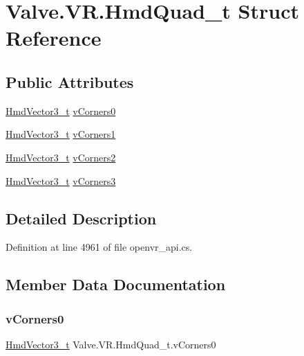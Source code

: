 \hypertarget{struct_valve_1_1_v_r_1_1_hmd_quad__t}{}\section{Valve.\+V\+R.\+Hmd\+Quad\+\_\+t Struct Reference}
\label{struct_valve_1_1_v_r_1_1_hmd_quad__t}
\subsection*{Public Attributes}
\begin{DoxyCompactItemize}
\item 
\mbox{\hyperlink{struct_valve_1_1_v_r_1_1_hmd_vector3__t}{Hmd\+Vector3\+\_\+t}} \mbox{\hyperlink{struct_valve_1_1_v_r_1_1_hmd_quad__t_a8ad6262a35282958dde758efa0df04b7}{v\+Corners0}}
\item 
\mbox{\hyperlink{struct_valve_1_1_v_r_1_1_hmd_vector3__t}{Hmd\+Vector3\+\_\+t}} \mbox{\hyperlink{struct_valve_1_1_v_r_1_1_hmd_quad__t_ab4707e8004066c071df0fb8875167c1b}{v\+Corners1}}
\item 
\mbox{\hyperlink{struct_valve_1_1_v_r_1_1_hmd_vector3__t}{Hmd\+Vector3\+\_\+t}} \mbox{\hyperlink{struct_valve_1_1_v_r_1_1_hmd_quad__t_afc6fa226f980e5c5e5a997c4d9917a6a}{v\+Corners2}}
\item 
\mbox{\hyperlink{struct_valve_1_1_v_r_1_1_hmd_vector3__t}{Hmd\+Vector3\+\_\+t}} \mbox{\hyperlink{struct_valve_1_1_v_r_1_1_hmd_quad__t_a3facb7a3d1900d2b85bd1260f99b08ee}{v\+Corners3}}
\end{DoxyCompactItemize}


\subsection{Detailed Description}


Definition at line 4961 of file openvr\+\_\+api.\+cs.



\subsection{Member Data Documentation}
\mbox{\label{struct_valve_1_1_v_r_1_1_hmd_quad__t_a8ad6262a35282958dde758efa0df04b7}} 
\subsubsection{\texorpdfstring{vCorners0}{vCorners0}}
{\footnotesize\ttfamily \mbox{\hyperlink{struct_valve_1_1_v_r_1_1_hmd_vector3__t}{Hmd\+Vector3\+\_\+t}} Valve.\+V\+R.\+Hmd\+Quad\+\_\+t.\+v\+Corners0}



